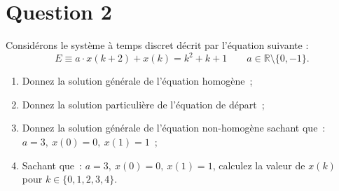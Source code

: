 \documentclass[11pt,a4paper]{report}
\begin{document}
	\pagebreak
	\section*{Question 2}
		Considérons le système à temps discret décrit par l'équation suivante :
		\[
			E \equiv a \cdot x(k+2) + x(k) = k^2 + k + 1 \qquad a \in \mathbb{R} \setminus \{0, -1\}.
		\]

		\begin{enumerate}
			\item Donnez la solution générale de l'équation homogène~;
			\item Donnez la solution particulière de l'équation de départ~;
			\item Donnez la solution générale de l'équation non-homogène sachant que~: $a=3,\ x(0) = 0,\ x(1) = 1$~;
			\item Sachant que~: $a=3,\ x(0) = 0,\ x(1) = 1$, calculez la valeur de $x(k)$ pour $k \in \{ 0,1,2,3,4 \}$.
		\end{enumerate}
		\pagebreak
\end{document}
